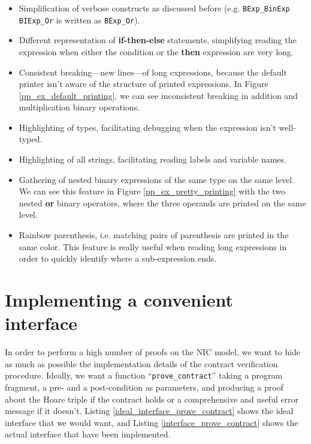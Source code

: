 \documentclass{kththesis}
\begin{document}
{\begin{itemize}
    \item Simplification of verbose constructs as discussed before (e.g. \texttt{BExp\_BinExp BIExp\_Or} is written as \texttt{BExp\_Or}).
    \item Different representation of \textbf{if-then-else} statements, simplifying reading the expression when either the condition or the \textbf{then} expression are very long.
    \item Consistent breaking---new lines---of long expressions, because the default printer isn't aware of the structure of printed expressions. In Figure \ref{pp_ex_default_printing}, we can see inconsistent breaking in addition and multiplication binary operations.
    \item Highlighting of types, facilitating debugging when the expression isn't well-typed.
    \item Highlighting of all strings, facilitating reading labels and variable names.
    \item Gathering of nested binary expressions of the same type on the same level. We can see this feature in Figure \ref{pp_ex_pretty_printing} with the two nested \textbf{or} binary operators, where the three operands are printed on the same level.
    \item Rainbow parenthesis, i.e. matching pairs of parenthesis are printed in the same color. This feature is really useful when reading long expressions in order to quickly identify where a sub-expression ends.
\end{itemize}


\section{Implementing a convenient interface} \label{impl_convenient_ht_interface}

In order to perform a high number of proofs on the \gls{NIC} model, we want to hide as much as possible the implementation details of the contract verification procedure. Ideally, we want a function ``\texttt{prove\_contract}'' taking a program fragment, a pre- and a post-condition as parameters, and producing a proof about the Hoare triple if the contract holds or a comprehensive and useful error message if it doesn't. Listing \ref{ideal_interface_prove_contract} shows the ideal interface that we would want, and Listing \ref{interface_prove_contract} shows the actual interface that have been implemented.

}
\end{document}
